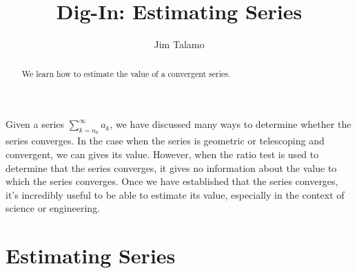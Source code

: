 \documentclass{ximera}
\author{Jim Talamo}
\title{Dig-In: Estimating Series}
\begin{document}
\begin{abstract}
    We learn how to estimate the value of a convergent series.
\end{abstract}
\maketitle

Given a series $\sum_{k=n_0}^{\infty} a_k$, we have discussed many ways to determine whether the series converges.  In the case when the series is geometric or telescoping and convergent, we can gives its value.  However, when the ratio test is used to determine that the series converges, it gives no information about the value to which the series converges.  Once we have established that the series converges, it's incredibly useful to be able to estimate its value, especially in the context of science or engineering.  

\section{Estimating Series}
\end{document}
